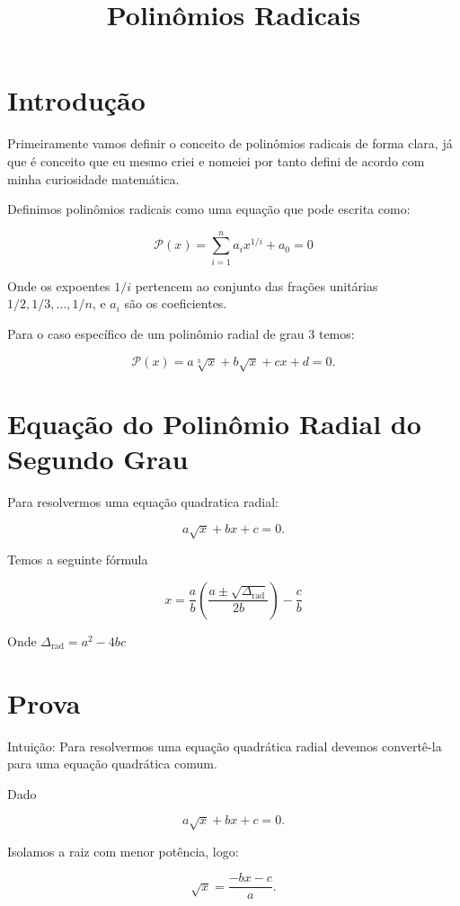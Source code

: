 \documentclass{article}
\title{Polinômios Radicais}
\author{}
\date{}
\begin{document}
\maketitle

\section{Introdução}

Primeiramente vamos definir o conceito de polinômios radicais de forma clara, já que é conceito que eu mesmo criei e nomeiei por tanto defini de acordo com minha curiosidade matemática.

Definimos polinômios radicais como uma equação que pode escrita como: 

\[
\mathcal{P}(x) = \sum_{i=1}^{n} a_i x^{1/i} + a_0 = 0
\]

Onde os expoentes $1/i$ pertencem ao conjunto das frações unitárias $1/2, 1/3, \dots, 1/n$, e $a_i$ são os coeficientes. 

Para o caso específico de um polinômio radial de grau 3 temos:

\[
\mathcal{P}(x) = a\sqrt[3]{x} + b\sqrt{x} + cx + d = 0.
\]

\section{Equação do Polinômio Radial do Segundo Grau}

Para resolvermos uma equação quadratica radial:

\[
a\sqrt{x} + bx + c = 0.
\]

Temos a seguinte fórmula

\[
x = \frac{a}{b}\left(\frac{a \pm \sqrt{\Delta_{\text{rad}}}}{2b}\right)- \frac{c}{b}
\]

Onde $\Delta_{\text{rad}}= a^2-4bc$

\clearpage

\section{Prova}

Intuição: Para resolvermos uma equação quadrática radial devemos convertê-la para uma equação quadrática comum.

Dado

\[
a\sqrt{x} + bx + c = 0.
\]

Isolamos a raiz com menor potência, logo:

\[
\sqrt{x}= \frac{-bx - c}{a}.
\]
\end{document}
